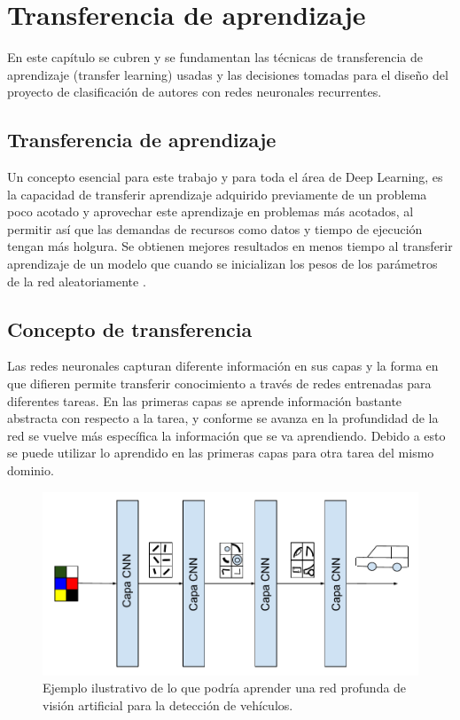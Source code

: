 
\chapter{Transferencia de aprendizaje} %

\label{Chapter3} %

En este capítulo se cubren y se fundamentan las técnicas de transferencia de aprendizaje (transfer learning) usadas y las decisiones tomadas para el diseño del proyecto de clasificación de autores con redes neuronales recurrentes.

\section{Transferencia de aprendizaje} %

Un concepto esencial para este trabajo y para toda el área de Deep Learning, es la capacidad de transferir aprendizaje adquirido previamente de un problema poco acotado y aprovechar este aprendizaje en problemas más acotados, al permitir así que las demandas de recursos como datos y tiempo de ejecución tengan más holgura. Se obtienen mejores resultados en menos tiempo al transferir aprendizaje de un modelo que cuando se inicializan los pesos de los parámetros de la red aleatoriamente \parencite{Erhan:2010:WUP}.

\section{Concepto de transferencia}

Las redes neuronales capturan diferente información en sus capas \parencite{yosinski:2014, zeiler2014visualizing} y la forma en que difieren permite transferir conocimiento a través de redes entrenadas para diferentes tareas. En las primeras capas se aprende información bastante abstracta con respecto a la tarea, y conforme se avanza en la profundidad de la red se vuelve más específica la información que se va aprendiendo. Debido a esto se puede utilizar lo aprendido en las primeras capas para otra tarea del mismo dominio.

\begin{figure}
\includegraphics[scale=1]{Figures/learnbylayer.pdf}
\caption{Ejemplo ilustrativo de lo que podría aprender una red profunda de visión artificial para la detección de vehículos.}
\label{fig:learnbylayer}
\end{figure}

